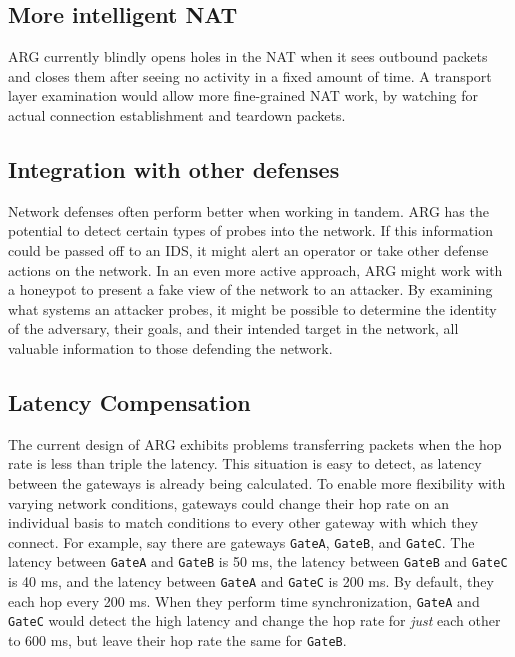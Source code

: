 
\subsection{More intelligent NAT}
\par \ac{ARG} currently blindly opens holes in the \ac{NAT} when it sees outbound packets and closes them after seeing no activity in a fixed amount of time. A transport layer examination would allow more fine-grained \ac{NAT} work, by watching for actual connection establishment and teardown packets. 

\subsection{Integration with other defenses}
\par Network defenses often perform better when working in tandem. \ac{ARG} has the potential to detect certain types of probes into the network. If this information could be passed off to an \ac{IDS}, it might alert an operator or take other defense actions on the network. In an even more active approach, \ac{ARG} might work with a honeypot to present a fake view of the network to an attacker. By examining what systems an attacker probes, it might be possible to determine the identity of the adversary, their goals, and their intended target in the network, all valuable information to those defending the network.

\subsection{Latency Compensation}
\par The current design of \ac{ARG} exhibits problems transferring packets when the hop rate is less than triple the latency. This situation is easy to detect, as latency between the gateways is already being calculated. To enable more flexibility with varying network conditions, gateways could change their hop rate on an individual basis to match conditions to every other gateway with which they connect. For example, say there are gateways \texttt{GateA}, \texttt{GateB}, and \texttt{GateC}. The latency between \texttt{GateA} and \texttt{GateB} is 50 ms, the latency between \texttt{GateB} and \texttt{GateC} is 40 ms, and the latency between \texttt{GateA} and \texttt{GateC} is 200 ms. By default, they each hop every 200 ms. When they perform time synchronization, \texttt{GateA} and \texttt{GateC} would detect the high latency and change the hop rate for \textit{just} each other to 600 ms, but leave their hop rate the same for \texttt{GateB}. 

